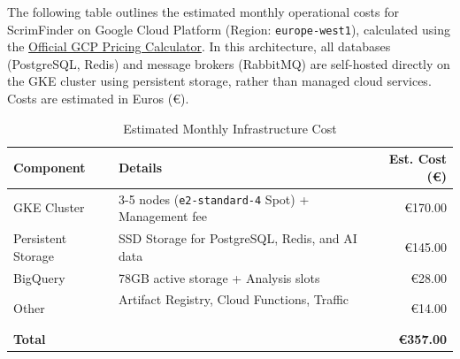 \documentclass[11pt,a4paper]{article}
\newcommand{\bff}[1]{\textbf{#1}}
\begin{document}
 The following table outlines the estimated monthly operational costs for ScrimFinder on Google Cloud Platform (Region: \texttt{europe-west1}), calculated using the \href{https://cloud.google.com/products/calculator}{Official GCP Pricing Calculator}. In this architecture, all databases (PostgreSQL, Redis) and message brokers (RabbitMQ) are self-hosted directly on the GKE cluster using persistent storage, rather than managed cloud services. Costs are estimated in Euros (\euro).

 \begin{table}[H]
 \centering
 \begin{tabular}{|l|p{6cm}|r|}
 \hline
 \bff{Component}     & \bff{Details}           & \bff{Est. Cost (\euro)} \\ \hline
 GKE Cluster\footnotemark  & 3-5 nodes (\texttt{e2-standard-4} Spot) + Management fee & \euro 170.00 \\ \hline
 Persistent Storage\footnotemark & SSD Storage for PostgreSQL, Redis, and AI data   & \euro 145.00 \\ \hline
 BigQuery\footnotemark   & 78GB active storage + Analysis slots      & \euro 28.00 \\ \hline
 Other\footnotemark     & Artifact Registry, Cloud Functions, Traffic     & \euro 14.00 \\ \hline
 \bff{Total}      &                & \bff{\euro 357.00} \\ \hline
 \end{tabular}
 \caption{Estimated Monthly Infrastructure Cost}
 \label{tab:cost-analysis}
 \end{table}

 \addtocounter{footnote}{-3}
\end{document}
